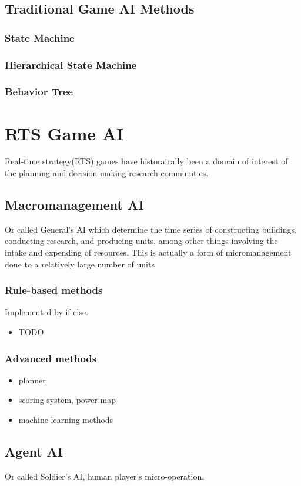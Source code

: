 \documentclass[sigconf]{acmart}
\begin{document}
\subsection{Traditional Game AI Methods}
\subsubsection{State Machine}
\subsubsection{Hierarchical State Machine}
\subsubsection{Behavior Tree}

\section{RTS Game AI}
Real-time strategy(RTS) games have historaically been a domain of interest of the planning and decision making research communities.
\subsection{Macromanagement AI}
Or called General's AI which determine the time series of constructing buildings, conducting research, and producing units, among other things involving the intake and expending of resources. This is actually a form of micromanagement done to a relatively large number of units
\subsubsection{Rule-based methods}
Implemented by if-else.
\begin{itemize}
\item TODO
\end{itemize}

\subsubsection{Advanced methods}
\begin{itemize}
\item planner
\item scoring system, power map
\item machine learning methods
\end{itemize}

\subsection{Agent AI}
Or called Soldier's AI, human player's micro-operation.
\end{document}
